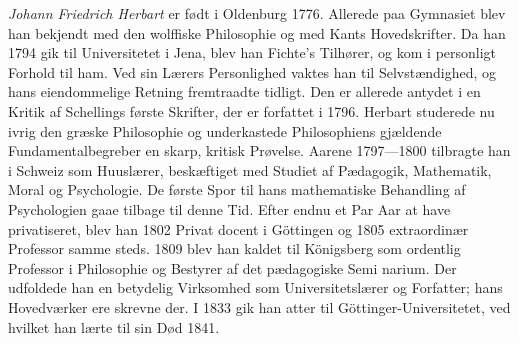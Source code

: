 \documentclass[12pt,a4paper]{book}
\begin{document}
\emph{Johann Friedrich Herbart} er født i Oldenburg 1776.
Allerede paa Gymnasiet blev han bekjendt med den wolffiske
Philosophie og med Kants Hovedskrifter. Da han 1794 gik
til Universitetet i Jena, blev han Fichte's Tilhører, og kom i
personligt Forhold til ham. Ved sin Lærers Personlighed
vaktes han til Selvstændighed, og hans eiendommelige Retning
fremtraadte tidligt. Den er allerede antydet i en Kritik af
Schellings første Skrifter, der er forfattet i 1796. Herbart
studerede nu ivrig den græske Philosophie og underkastede
Philosophiens gjældende Fundamentalbegreber en skarp, kritisk
Prøvelse. Aarene 1797---1800 tilbragte han i Schweiz som
Huuslærer, beskæftiget med Studiet af Pædagogik, Mathematik,
Moral og Psychologie. De første Spor til hans mathematiske
Behandling af Psychologien gaae tilbage til denne Tid. Efter
endnu et Par Aar at have privatiseret, blev han 1802 Privat\-%
docent i Göttingen og 1805 extraordinær Professor samme\-%
steds. 1809 blev han kaldet til Königsberg som ordentlig
Professor i Philosophie og Bestyrer af det pædagogiske Semi\-%
narium. Der udfoldede han en betydelig Virksomhed som
Universitetslærer og Forfatter; hans Hovedværker ere skrevne
der. I 1833 gik han atter til Göttinger-Universitetet, ved
hvilket han lærte til sin Død 1841.
\end{document}
